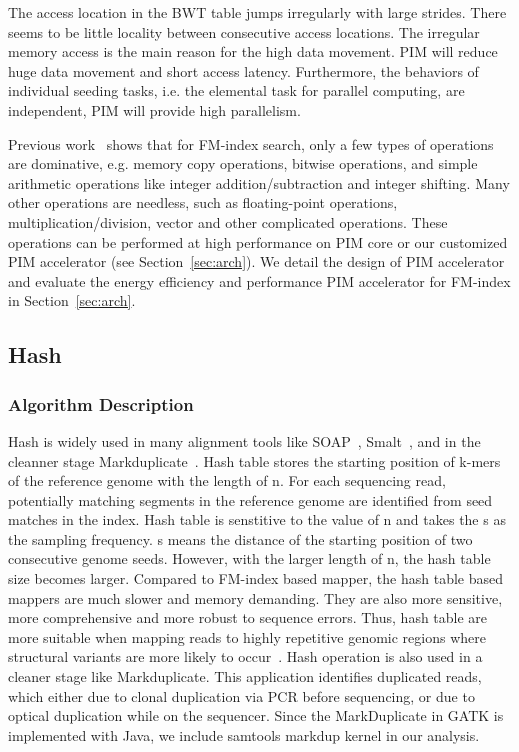The access location in the BWT table jumps irregularly with large strides. There seems to be little locality between consecutive access locations. The irregular memory access is the main reason for the high data movement. PIM will reduce huge data movement and short access latency. Furthermore, the behaviors of individual seeding tasks, i.e. the elemental task for parallel computing, are independent, PIM will provide high parallelism.

Previous work~\cite{yuanrong} shows that for FM-index search, only a few types of operations are dominative, e.g. memory copy operations, bitwise operations, and simple arithmetic operations like integer addition/subtraction and integer shifting. Many other operations are needless, such as floating-point operations, multiplication/division, vector and other complicated operations. These operations can be performed at high performance on PIM core or our customized PIM accelerator (see Section~\ref{sec:arch}). We detail the design of PIM accelerator and evaluate the energy efficiency and performance PIM accelerator for FM-index in Section~\ref{sec:arch}.

\subsection{Hash}
\subsubsection{Algorithm Description}
Hash is widely used in many alignment tools like SOAP~\cite{Wang:2012hw}, Smalt~\cite{SMALT}, and in the cleanner stage Markduplicate~\cite{li2009sequence}. Hash table stores the starting position of k-mers of the reference genome with the length of n. For each sequencing read, potentially matching segments in the reference genome are identified from seed matches in the index. Hash table is senstitive to the value of n and takes the s as the sampling frequency. s means the distance of the starting position of two consecutive genome seeds. However, with the larger length of n, the hash table size becomes larger. Compared to FM-index based mapper, the hash table based mappers are much slower and memory demanding. They are also more sensitive, more comprehensive and more robust to sequence
errors. Thus, hash table are more suitable when mapping reads to highly repetitive genomic regions where structural variants are more likely to occur~\cite{SMALT}. Hash operation is also used in a cleaner stage like Markduplicate. This application identifies duplicated reads, which either due to clonal duplication via PCR before sequencing, or due to optical duplication while on the sequencer. Since the MarkDuplicate in GATK is implemented with Java, we include samtools markdup kernel in our analysis.

